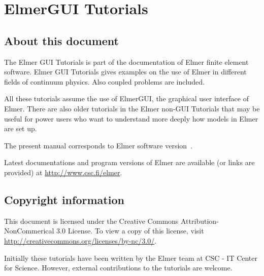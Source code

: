 \chapter*{ElmerGUI Tutorials}

\section*{About this document}

The Elmer GUI Tutorials is part of the documentation of Elmer finite element software.
Elmer GUI Tutorials gives examples on the use of Elmer in different fields
of continuum physics. Also coupled problems are included. 

All these tutorials assume the use of ElmerGUI, the graphical user interface of 
Elmer. There are also older tutorials in the Elmer non-GUI Tutorials that 
may be useful for power users who want to understand more deeply 
how models in Elmer are set up.

The present manual corresponds to Elmer software version~\elmerversion{}.

Latest documentations and program versions of Elmer are available (or links are provided) at 
\url{http://www.csc.fi/elmer}. 

\section*{Copyright information}

This document is licensed under the Creative Commons Attribution-NonCommerical 3.0 License. 
To view a copy of this license, visit \url{http://creativecommons.org/licenses/by-nc/3.0/}.

Initially these tutorials have been written by the Elmer team at CSC - IT Center for Science. 
However, external contributions to the tutorials are welcome. 

